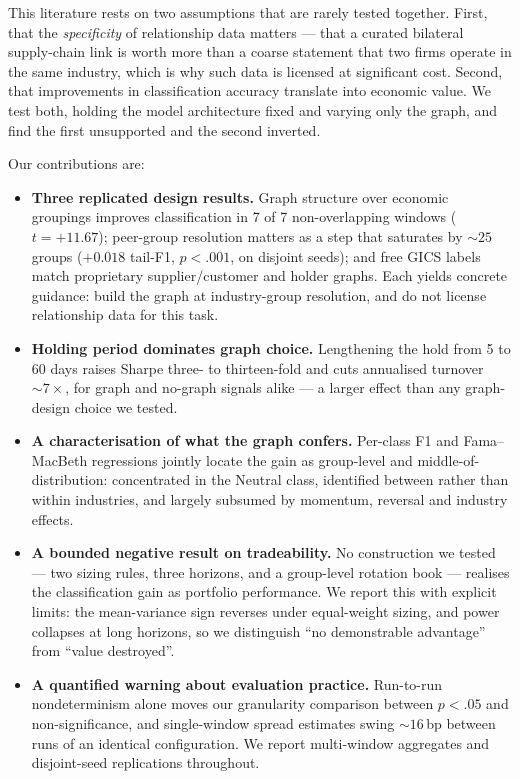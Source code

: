 \documentclass[11pt]{airesearch}
\begin{document}
This literature rests on two assumptions that are rarely tested together.
First, that the \emph{specificity} of relationship data matters --- that a
curated bilateral supply-chain link is worth more than a coarse statement that
two firms operate in the same industry, which is why such data is licensed at
significant cost. Second, that improvements in classification accuracy
translate into economic value. We test both, holding the model architecture
fixed and varying only the graph, and find the first unsupported and the
second inverted.

Our contributions are:

\begin{itemize}
\item \textbf{Three replicated design results.} Graph structure over economic
  groupings improves classification in 7 of 7 non-overlapping windows
  ($t=+11.67$); peer-group resolution matters as a step that saturates by
  ${\sim}25$ groups ($+0.018$ tail-F1, $p<.001$, on disjoint seeds); and free
  GICS labels match proprietary supplier/customer and holder graphs. Each
  yields concrete guidance: build the graph at industry-group resolution, and
  do not license relationship data for this task.
\item \textbf{Holding period dominates graph choice.} Lengthening the hold
  from 5 to 60 days raises Sharpe three- to thirteen-fold and cuts annualised
  turnover ${\sim}7\times$, for graph and no-graph signals alike --- a larger
  effect than any graph-design choice we tested.
\item \textbf{A characterisation of what the graph confers.} Per-class F1 and
  Fama--MacBeth regressions jointly locate the gain as group-level and
  middle-of-distribution: concentrated in the Neutral class, identified
  between rather than within industries, and largely subsumed by momentum,
  reversal and industry effects.
\item \textbf{A bounded negative result on tradeability.} No construction we
  tested --- two sizing rules, three horizons, and a group-level rotation book
  --- realises the classification gain as portfolio performance. We report
  this with explicit limits: the mean-variance sign reverses under
  equal-weight sizing, and power collapses at long horizons, so we
  distinguish ``no demonstrable advantage'' from ``value destroyed''.
\item \textbf{A quantified warning about evaluation practice.} Run-to-run
  nondeterminism alone moves our granularity comparison between $p<.05$ and
  non-significance, and single-window spread estimates swing ${\sim}16$\,bp
  between runs of an identical configuration. We report multi-window
  aggregates and disjoint-seed replications throughout.
\end{itemize}
\end{document}
